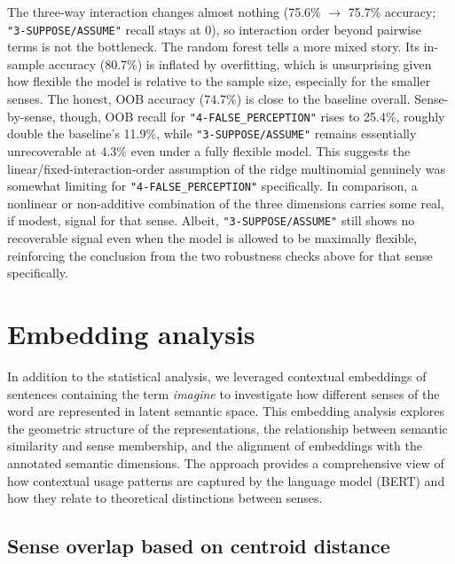 \documentclass[
]{article}
\begin{document}
The three-way interaction changes almost nothing (75.6\% \(\to\) 75.7\%
accuracy; \texttt{"3-SUPPOSE/ASSUME"} recall stays at 0), so interaction
order beyond pairwise terms is not the bottleneck. The random forest
tells a more mixed story. Its in-sample accuracy (80.7\%) is inflated by
overfitting, which is unsurprising given how flexible the model is
relative to the sample size, especially for the smaller senses. The
honest, OOB accuracy (74.7\%) is close to the baseline overall.
Sense-by-sense, though, OOB recall for \texttt{"4-FALSE\_PERCEPTION"}
rises to 25.4\%, roughly double the baseline's 11.9\%, while
\texttt{"3-SUPPOSE/ASSUME"} remains essentially unrecoverable at 4.3\%
even under a fully flexible model. This suggests the
linear/fixed-interaction-order assumption of the ridge multinomial
genuinely was somewhat limiting for \texttt{"4-FALSE\_PERCEPTION"}
specifically. In comparison, a nonlinear or non-additive combination of
the three dimensions carries some real, if modest, signal for that
sense. Albeit, \texttt{"3-SUPPOSE/ASSUME"} still shows no recoverable
signal even when the model is allowed to be maximally flexible,
reinforcing the conclusion from the two robustness checks above for that
sense specifically.

\pagebreak

\section{Embedding analysis}\label{embedding-analysis}

In addition to the statistical analysis, we leveraged contextual
embeddings of sentences containing the term \textit{imagine} to
investigate how different senses of the word are represented in latent
semantic space. This embedding analysis explores the geometric structure
of the representations, the relationship between semantic similarity and
sense membership, and the alignment of embeddings with the annotated
semantic dimensions. The approach provides a comprehensive view of how
contextual usage patterns are captured by the language model (BERT) and
how they relate to theoretical distinctions between senses.

\subsection{Sense overlap based on centroid
distance}\label{sense-overlap-based-on-centroid-distance}
\end{document}
